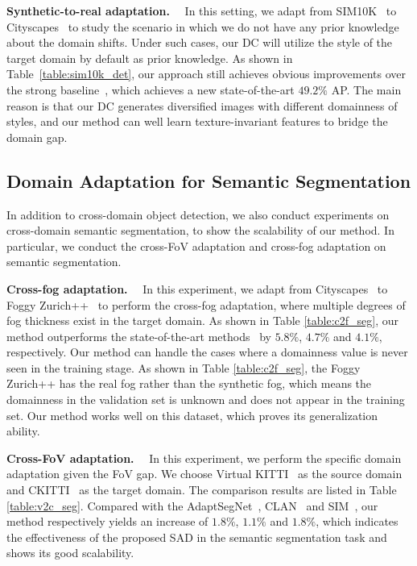 \documentclass[10pt,journal,compsoc]{IEEEtran}
\renewcommand{\paragraph}[1]{\noindent\textbf{#1}~~}
\begin{document}
\paragraph{Synthetic-to-real adaptation.}
In this setting, we adapt from SIM10K~\cite{sim10k} to Cityscapes~\cite{cordts2016cityscapes} to study the scenario in which we do not have any prior knowledge about the domain shifts. Under such cases, our DC will utilize the style of the target domain by default as prior knowledge. As shown in Table~\ref{table:sim10k_det}, our approach still achieves obvious improvements over the strong baseline~\cite{GPA}, which achieves a new state-of-the-art $49.2\%$ AP. 
The main reason is that our DC generates diversified images with different domainness of styles, and our method can well learn texture-invariant features to bridge the domain gap. 




\subsection{Domain Adaptation for Semantic Segmentation}
\label{sec:DASS}
In addition to cross-domain object detection, we also conduct experiments on cross-domain semantic segmentation, to show the scalability of our method. In particular, we conduct the cross-FoV adaptation and cross-fog adaptation on semantic segmentation.


\paragraph{Cross-fog adaptation.}
In this experiment, we adapt from Cityscapes~\cite{cordts2016cityscapes} to Foggy Zurich++~\cite{FoggyCity,FoggyDriving} to perform the cross-fog adaptation, where multiple degrees of fog thickness exist in the target domain. As shown in Table \ref{table:c2f_seg}, our method outperforms the state-of-the-art methods~\cite{AdaptSegNet,CLAN,SIM} by $5.8\%$, $4.7\%$ and $4.1\%$, respectively. 
Our method can handle the cases where a domainness value is never seen in the training stage. As shown in Table \ref{table:c2f_seg}, the Foggy Zurich++ has the real fog rather than the synthetic fog, which means the domainness in the validation set is unknown and does not appear in the training set. Our method works well on this dataset, which proves its generalization ability. 

\paragraph{Cross-FoV adaptation.}
In this experiment, we perform the specific domain adaptation given the FoV gap. We choose Virtual KITTI~\cite{VKITTI} as the source domain and CKITTI~\cite{kITTI,cordts2016cityscapes} as the target domain. The comparison results are listed in Table \ref{table:v2c_seg}. Compared with the AdaptSegNet~\cite{AdaptSegNet}, CLAN~\cite{CLAN} and SIM~\cite{SIM}, our method respectively yields an increase of $1.8\%$, $1.1\%$ and $1.8\%$, which indicates the effectiveness of the proposed SAD in the semantic segmentation task and shows its good scalability.
\end{document}

